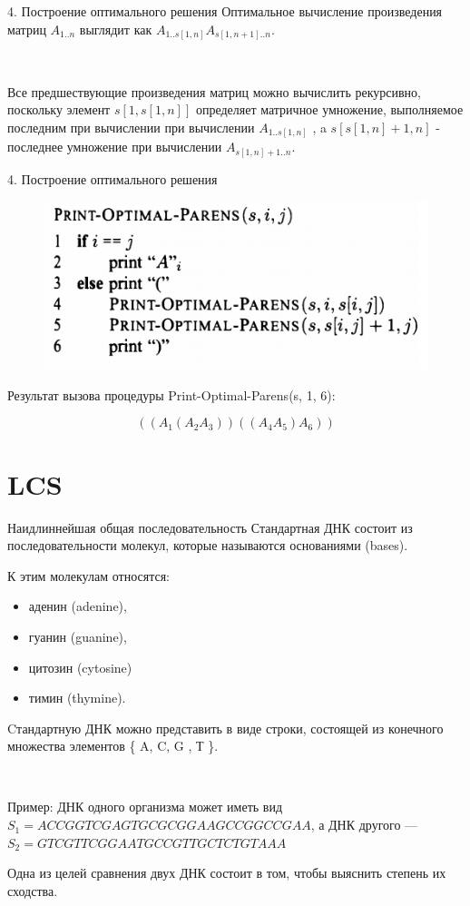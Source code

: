 \documentclass{beamer}
\begin{document}
\begin{frame}[t]{4. Построение оптимального решения}
    Оптимальное вычисление произведения матриц $A_{1..n}$ выглядит как 
$A_{1..s[1,n]} A_{s[1,n+1]..n}$.

    ~
    
    Все предшествующие произведения матриц можно вычислить рекурсивно, поскольку элемент $s[1,s[1,n]]$ определяет матричное умножение, выполняемое последним при вычислении при вычислении $A_{1..s[1,n]}$ , a
    $s[s[1,n]+1, n]$ - последнее умножение при вычислении $A_{s[1,n]+1..n}$.
\end{frame}

\begin{frame}[t]{4. Построение оптимального решения}
    \begin{figure}[h]
		\centering
		\includegraphics[scale=0.75]{images/lec09-pic18.png}
	\end{figure} 
	
	Результат вызова процедуры Print-Optimal-Parens(s, 1, 6):
	
	\[((A_1(A_2A_3))((A_4A_5)A_6))\]
\end{frame}

\section{LCS}

\begin{frame}[t]{Наидлиннейшая общая последовательность}
     Стандартная ДНК состоит из последовательности молекул, которые называются основаниями (bases). 
     
     К этим молекулам относятся:
     \begin{itemize}
         \item аденин (adenine), 
         \item гуанин (guanine), 
         \item цитозин (cytosine) 
         \item тимин (thymine). 
     \end{itemize}
     Cтандартную ДНК можно представить в виде строки, состоящей из конечного множества элементов \{ A, C, G , Т \}. 
     
     ~
     
     Пример: ДНК одного организма может иметь вид $S_1=ACCGGTCGAGTGCGCGGAAGCCGGCCGAA$, а ДНК другого —
$S_2= GTCGTTCGGAATGCCGTTGCTCTGTAAA$ 

    Одна из целей сравнения двух ДНК состоит в том, чтобы выяснить степень их сходства.
\end{frame}
\end{document}

